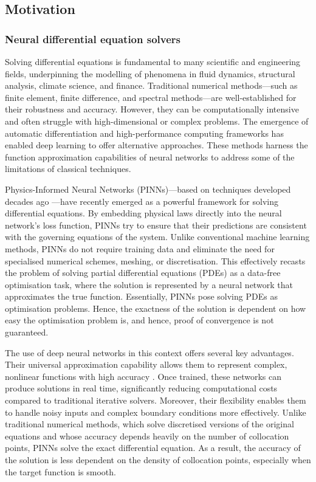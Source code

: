 \documentclass{article}
\begin{document}
\subsection{Motivation}
\label{motivation}

\subsubsection{Neural differential equation solvers}
\label{ndesolver}
Solving differential equations is fundamental to many scientific and engineering fields, underpinning the modelling of phenomena in fluid dynamics, structural analysis, climate science, and finance. Traditional numerical methods—such as finite element, finite difference, and spectral methods—are well-established for their robustness and accuracy. However, they can be computationally intensive and often struggle with high-dimensional or complex problems. The emergence of automatic differentiation \cite{baydin2018automatic} and high-performance computing frameworks \cite{cuda2008, tensorflow2015, torch2017} has enabled deep learning \cite{lecun2015deep} to offer alternative approaches. These methods harness the function approximation capabilities of neural networks to address some of the limitations of classical techniques.

Physics-Informed Neural Networks (PINNs)—based on techniques developed decades ago \cite{dissanayake1994neural, lagaris1998artificial, RAISSI2019686}—have recently emerged as a powerful framework for solving differential equations. By embedding physical laws directly into the neural network's loss function, PINNs try to ensure that their predictions are consistent with the governing equations of the system. Unlike conventional machine learning methods, PINNs do not require training data and eliminate the need for specialised numerical schemes, meshing, or discretisation. This effectively recasts the problem of solving partial differential equations (PDEs) as a data-free optimisation task, where the solution is represented by a neural network that approximates the true function. Essentially, PINNs pose solving PDEs as optimisation problems. Hence, the exactness of the solution is dependent on how easy the optimisation problem is, and hence, proof of convergence is not guaranteed.  

The use of deep neural networks in this context offers several key advantages. Their universal approximation capability allows them to represent complex, nonlinear functions with high accuracy \cite{Cybenko1989ApproximationBS, HORNIK1989359, HORNIK1991251}. Once trained, these networks can produce solutions in real time, significantly reducing computational costs compared to traditional iterative solvers. Moreover, their flexibility enables them to handle noisy inputs and complex boundary conditions more effectively. Unlike traditional numerical methods, which solve discretised versions of the original equations and whose accuracy depends heavily on the number of collocation points, PINNs solve the exact differential equation. As a result, the accuracy of the solution is less dependent on the density of collocation points, especially when the target function is smooth.
\end{document}

